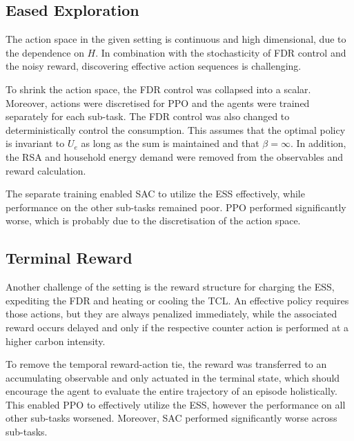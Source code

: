 \subsection{Eased Exploration}
The action space in the given setting is continuous and high dimensional, due to the dependence on $H$. In combination with the stochasticity of FDR control and the noisy reward, discovering effective action sequences is challenging.
\par
To shrink the action space, the FDR control was collapsed into a scalar. Moreover, actions were discretised for PPO and the agents were trained separately for each sub-task. The FDR control was also changed to deterministically control the consumption. This assumes that the optimal policy is invariant to $U_e$ as long as the sum is maintained and that $\beta = \infty$. In addition, the RSA and household energy demand were removed from the observables and reward calculation.
\par
The separate training enabled SAC to utilize the ESS effectively, while performance on the other sub-tasks remained poor. PPO performed significantly worse, which is probably due to the discretisation of the action space.


\subsection{Terminal Reward}
Another challenge of the setting is the reward structure for charging the ESS, expediting the FDR and heating or cooling the TCL. An effective policy requires those actions, but they are always penalized immediately, while the associated reward occurs delayed and only if the respective counter action is performed at a higher carbon intensity.
\par
To remove the temporal reward-action tie, the reward was transferred to an accumulating observable and only actuated in the terminal state, which should encourage the agent to evaluate the entire trajectory of an episode holistically. This enabled PPO to effectively utilize the ESS, however the performance on all other sub-tasks worsened. Moreover, SAC performed significantly worse across sub-tasks.